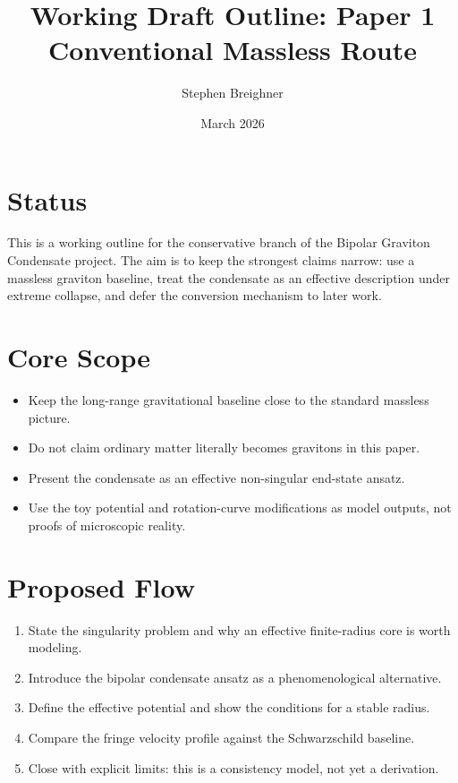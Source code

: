 \documentclass[11pt]{article}
\title{\textbf{Working Draft Outline: Paper 1 \\ Conventional Massless Route}}
\author{Stephen Breighner}
\date{March 2026}
\begin{document}
\maketitle

\section*{Status}
This is a working outline for the conservative branch of the Bipolar Graviton Condensate project. The aim is to keep the strongest claims narrow: use a massless graviton baseline, treat the condensate as an effective description under extreme collapse, and defer the conversion mechanism to later work.

\section*{Core Scope}
\begin{itemize}[leftmargin=1.25em]
  \item Keep the long-range gravitational baseline close to the standard massless picture.
  \item Do not claim ordinary matter literally becomes gravitons in this paper.
  \item Present the condensate as an effective non-singular end-state ansatz.
  \item Use the toy potential and rotation-curve modifications as model outputs, not proofs of microscopic reality.
\end{itemize}

\section*{Proposed Flow}
\begin{enumerate}[leftmargin=1.4em]
  \item State the singularity problem and why an effective finite-radius core is worth modeling.
  \item Introduce the bipolar condensate ansatz as a phenomenological alternative.
  \item Define the effective potential and show the conditions for a stable radius.
  \item Compare the fringe velocity profile against the Schwarzschild baseline.
  \item Close with explicit limits: this is a consistency model, not yet a derivation.
\end{enumerate}
\end{document}
